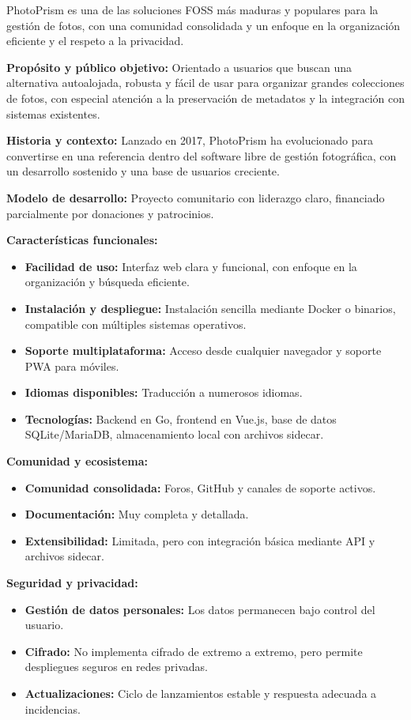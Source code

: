 PhotoPrism es una de las soluciones FOSS más maduras y populares para la gestión de fotos, con una comunidad consolidada y un enfoque en la organización eficiente y el respeto a la privacidad.

\textbf{Propósito y público objetivo:} Orientado a usuarios que buscan una alternativa autoalojada, robusta y fácil de usar para organizar grandes colecciones de fotos, con especial atención a la preservación de metadatos y la integración con sistemas existentes.

\textbf{Historia y contexto:} Lanzado en 2017, PhotoPrism ha evolucionado para convertirse en una referencia dentro del software libre de gestión fotográfica, con un desarrollo sostenido y una base de usuarios creciente.

\textbf{Modelo de desarrollo:} Proyecto comunitario con liderazgo claro, financiado parcialmente por donaciones y patrocinios.

\textbf{Características funcionales:}
\begin{itemize}
    \item \textbf{Facilidad de uso:} Interfaz web clara y funcional, con enfoque en la organización y búsqueda eficiente.
    \item \textbf{Instalación y despliegue:} Instalación sencilla mediante Docker o binarios, compatible con múltiples sistemas operativos.
    \item \textbf{Soporte multiplataforma:} Acceso desde cualquier navegador y soporte PWA para móviles.
    \item \textbf{Idiomas disponibles:} Traducción a numerosos idiomas.
    \item \textbf{Tecnologías:} Backend en Go, frontend en Vue.js, base de datos SQLite/MariaDB, almacenamiento local con archivos sidecar.
\end{itemize}

\textbf{Comunidad y ecosistema:}
\begin{itemize}
    \item \textbf{Comunidad consolidada:} Foros, GitHub y canales de soporte activos.
    \item \textbf{Documentación:} Muy completa y detallada.
    \item \textbf{Extensibilidad:} Limitada, pero con integración básica mediante API y archivos sidecar.
\end{itemize}

\textbf{Seguridad y privacidad:}
\begin{itemize}
    \item \textbf{Gestión de datos personales:} Los datos permanecen bajo control del usuario.
    \item \textbf{Cifrado:} No implementa cifrado de extremo a extremo, pero permite despliegues seguros en redes privadas.
    \item \textbf{Actualizaciones:} Ciclo de lanzamientos estable y respuesta adecuada a incidencias.
\end{itemize}

